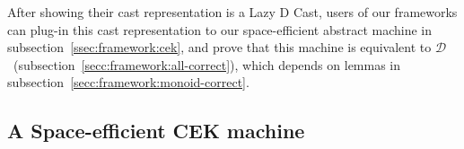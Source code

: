 \documentclass[acmsmall,review,anonymous]{acmart}\settopmatter{printfolios=true,printccs=false,printacmref=false}
\newcommand{\ineffCEKD}{$ \mathcal{D} $}
\begin{document}

After showing their cast representation is a Lazy D Cast, users of our 
frameworks can plug-in this cast representation to our space-efficient abstract 
machine in subsection~\ref{ssec:framework:cek}, and prove that this machine is 
equivalent to \ineffCEKD\ (subsection~\ref{secc:framework:all-correct}), which 
depends on lemmas in subsection~\ref{secc:framework:monoid-correct}.

\subsection{A Space-efficient CEK machine}
\label{sec:framework:cek}
\end{document}
